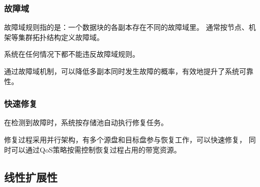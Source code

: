 \subsubsection{故障域}

故障域规则指的是：一个数据块的各副本存在不同的故障域里。
通常按节点、机架等集群拓扑结构定义故障域。

系统在任何情况下都不能违反故障域规则。

通过故障域机制，可以降低多副本同时发生故障的概率，有效地提升了系统可靠性。

\subsubsection{快速修复}

在检测到故障时，系统按存储池自动执行修复任务。

修复过程采用并行架构，有多个源盘和目标盘参与恢复工作，可以快速修复，
同时可以通过QoS策略按需控制恢复过程占用的带宽资源。

\subsection{线性扩展性}
